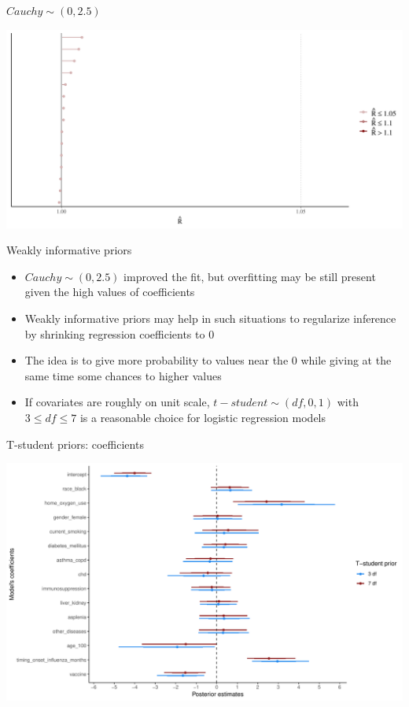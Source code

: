 \documentclass[ignorenonframetext,a4paper]{beamer}
\begin{document}
\begin{frame}{\(Cauchy \sim \left( 0, 2.5 \right)\)}

\includegraphics{DB_presentation_case_study_files/figure-beamer/unnamed-chunk-32-1.pdf}

\end{frame}

\begin{frame}{Weakly informative priors}

\begin{itemize}
\item
  \(Cauchy \sim \left( 0, 2.5 \right)\) improved the fit, but
  overfitting may be still present given the high values of coefficients
\item
  Weakly informative priors may help in such situations to regularize
  inference by shrinking regression coefficients to \(0\)
\item
  The idea is to give more probability to values near the \(0\) while
  giving at the same time some chances to higher values
\item
  If covariates are roughly on unit scale,
  \(t-student \sim \left(df, 0, 1 \right)\) with \(3 \leq df \leq 7\) is
  a reasonable choice for logistic regression models
\end{itemize}

\end{frame}

\begin{frame}{T-student priors: coefficients}

\includegraphics{DB_presentation_case_study_files/figure-beamer/unnamed-chunk-33-1.pdf}

\end{frame}
\end{document}
